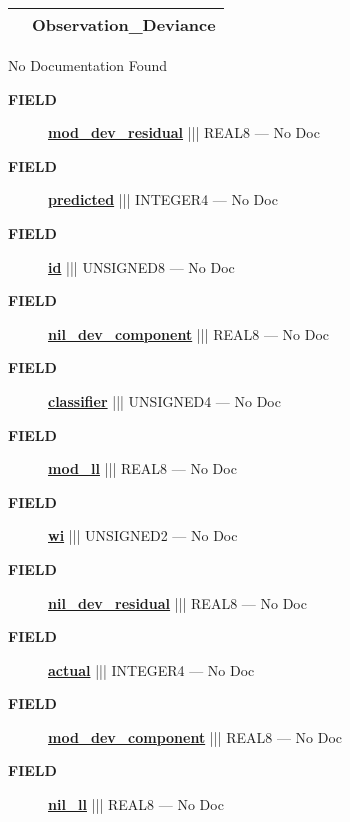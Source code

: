 {\renewcommand{\arraystretch}{1.5}
\begin{tabularx}{\textwidth}{|>{\raggedright\arraybackslash}l|X|}
\hline
\hspace{0pt}\mytexttt{\color{red} } & \textbf{Observation\_Deviance} \\
\hline
\end{tabularx}
}

\par





No Documentation Found







\par
\begin{description}
\item [\colorbox{tagtype}{\color{white} \textbf{\textsf{FIELD}}}] \textbf{\underline{mod\_dev\_residual}} ||| REAL8 --- No Doc
\item [\colorbox{tagtype}{\color{white} \textbf{\textsf{FIELD}}}] \textbf{\underline{predicted}} ||| INTEGER4 --- No Doc
\item [\colorbox{tagtype}{\color{white} \textbf{\textsf{FIELD}}}] \textbf{\underline{id}} ||| UNSIGNED8 --- No Doc
\item [\colorbox{tagtype}{\color{white} \textbf{\textsf{FIELD}}}] \textbf{\underline{nil\_dev\_component}} ||| REAL8 --- No Doc
\item [\colorbox{tagtype}{\color{white} \textbf{\textsf{FIELD}}}] \textbf{\underline{classifier}} ||| UNSIGNED4 --- No Doc
\item [\colorbox{tagtype}{\color{white} \textbf{\textsf{FIELD}}}] \textbf{\underline{mod\_ll}} ||| REAL8 --- No Doc
\item [\colorbox{tagtype}{\color{white} \textbf{\textsf{FIELD}}}] \textbf{\underline{wi}} ||| UNSIGNED2 --- No Doc
\item [\colorbox{tagtype}{\color{white} \textbf{\textsf{FIELD}}}] \textbf{\underline{nil\_dev\_residual}} ||| REAL8 --- No Doc
\item [\colorbox{tagtype}{\color{white} \textbf{\textsf{FIELD}}}] \textbf{\underline{actual}} ||| INTEGER4 --- No Doc
\item [\colorbox{tagtype}{\color{white} \textbf{\textsf{FIELD}}}] \textbf{\underline{mod\_dev\_component}} ||| REAL8 --- No Doc
\item [\colorbox{tagtype}{\color{white} \textbf{\textsf{FIELD}}}] \textbf{\underline{nil\_ll}} ||| REAL8 --- No Doc
\end{description}





